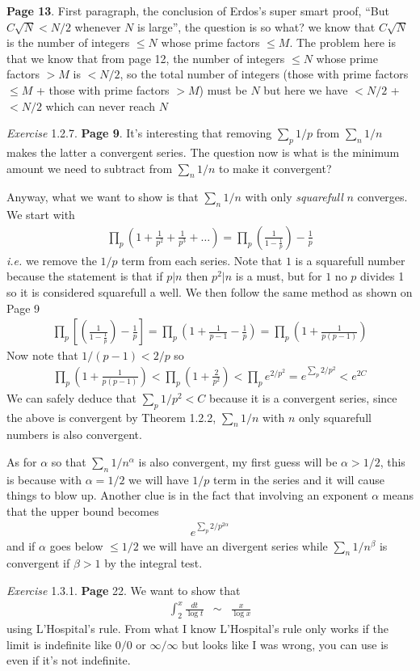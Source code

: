 \documentclass[aps,preprint,preprintnumbers,nofootinbib,showpacs,prd]{revtex4-1}
\newcommand{\ie}{{\it i.e.} }
\newcommand{\nbea}{\begin{eqnarray*}}
\newcommand{\neea}{\end{eqnarray*}}
\begin{document}
{\bf Page 13}. First paragraph, the conclusion of Erdos's super smart proof, ``But $C\sqrt{N} < N/2$ whenever $N$ is large'', the question is so what? we know that $C\sqrt{N}$ is the number of integers $\le N$ whose prime factors $\le M$. The problem here is that we know that from page 12, the number of integers $\le N$ whose prime factors $> M$ is $< N/2$, so the total number of integers (those with prime factors $\le M$ + those with prime factors $> M$) must be $N$ but here we have $< N/2$ + $< N/2$ which can never reach $N$



{\it Exercise} 1.2.7. {\bf Page 9}. It's interesting that removing $\sum_p 1/p$ from $\sum_n 1/n$ makes the latter a convergent series. The question now is what is the minimum amount we need to subtract from $\sum_n 1/n$ to make it convergent?

Anyway, what we want to show is that $\sum_n 1/n$ with only {\it squarefull} $n$ converges. We start with
%
\nbea
\prod_p \left( 1 + \frac{1}{p^2} + \frac{1}{p^3} + \dots\right ) = \prod_p \left (\frac{1}{1 - \frac{1}{p}} \right ) - \frac{1}{p}
\neea
%
\ie we remove the $1/p$ term from each series. Note that $1$ is a squarefull number because the statement is that if $p|n$ then $p^2|n$ is a must, but for $1$ no $p$ divides 1 so it is considered squarefull a well. We then follow the same method as shown on Page 9
%
\nbea
\prod_p \left\lbrack\left (\frac{1}{1 - \frac{1}{p}} \right ) - \frac{1}{p}\right\rbrack = \prod_p \left ( 1 + \frac{1}{p-1} - \frac{1}{p} \right ) = \prod_p \left( 1 + \frac{1}{p(p-1)}\right )
\neea
%
Now note that $1/(p-1) < 2/p$ so
%
\nbea
\prod_p \left( 1 + \frac{1}{p(p-1)}\right ) < \prod_p \left( 1 + \frac{2}{p^2}\right ) < \prod_p e^{2/p^2} = e^{\sum_{p} 2/p^2} < e^{2C}
\neea
%
We can safely deduce that $\sum_p 1/p^2 < C$ because it is a convergent series, since the above is convergent by Theorem 1.2.2, $\sum_n 1/n$ with $n$ only squarefull numbers is also convergent.

As for $\alpha$ so that $\sum_n 1/n^\alpha$ is also convergent, my first guess will be $\alpha > 1/2$, this is because with $\alpha = 1/2$ we will have $1/p$ term in the series and it will cause things to blow up. Another clue is in the fact that involving an exponent $\alpha$ means that the upper bound becomes
%
\nbea
e^{\sum_{p} 2/p^{2\alpha}}
\neea
%
and if $\alpha$ goes below $\le 1/2$ we will have an divergent series while $\sum_n 1/n^\beta$ is convergent if $\beta > 1$ by the integral test.

{\it Exercise } 1.3.1. {\bf Page} 22. We want to show that
%
\nbea
\int_2^x \frac{dt}{\log t} & \sim & \frac{x}{\log x}
\neea
%
using L'Hospital's rule. From what I know L'Hospital's rule only works if the limit is indefinite like $0/0$ or $\infty/\infty$ but looks like I was wrong, you can use is even if it's not indefinite.
\end{document}

